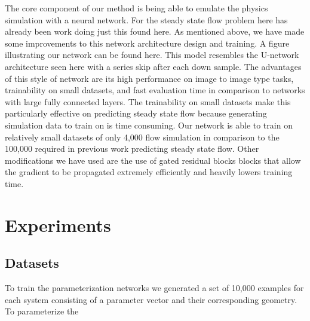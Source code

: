 \documentclass{article} %
\begin{document}
The core component of our method is being able to emulate the physics simulation with a neural network. For the steady state flow problem here has already been work doing just this found here. As mentioned above, we have made some improvements to this network architecture design and training. A figure illustrating our network can be found here. This model resembles the U-network architecture seen here with a series skip after each down sample. The advantages of this style of network are its high performance on image to image type tasks, trainability on small datasets, and fast evaluation time in comparison to networks with large fully connected layers. The trainability on small datasets make this particularly effective on predicting steady state flow because generating simulation data to train on is time consuming. Our network is able to train on relatively small datasets of only 4,000 flow simulation in comparison to the 100,000 required in previous work predicting steady state flow. Other modifications we have used are the use of gated residual blocks blocks that allow the gradient to be propagated extremely efficiently and heavily lowers training time.

\section{Experiments}


\subsection{Datasets}

To train the parameterization networks we generated a set of 10,000 examples for each system consisting of a parameter vector and their corresponding geometry. To parameterize the
\end{document}
